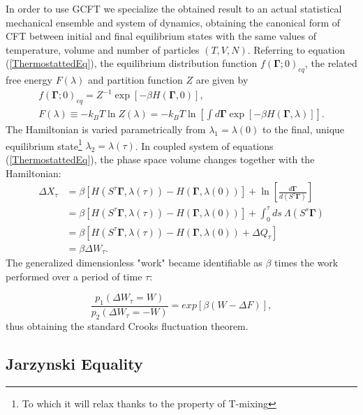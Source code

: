 \documentclass[a4paper,12pt]{article}
\begin{document}
In order to use GCFT we specialize the obtained result to an actual statistical mechanical ensemble and system of dynamics, obtaining the canonical form of CFT between initial and final equilibrium states with the same values of temperature, volume and number of particles $(T,V,N)$. 
Referring to equation (\ref{ThermostattedEq}), the equilibrium distribution function $f(\bm{\Gamma};0)_{eq}$, the related free energy $F(\lambda)$ and partition function $Z$ are given by
\begin{equation}
\begin{aligned}
  f(\bm{\Gamma};0)_{eq}=Z^{-1} \exp[-\beta H(\bm{\Gamma},0)],\\
  F(\lambda)\equiv - k_B T \ln Z(\lambda) = -k_B T \ln[\int d\bm{\Gamma} \exp[-\beta H(\bm{\Gamma},\lambda)]].
\end{aligned}
\end{equation}
The Hamiltonian is varied parametrically from $\lambda_1 =\lambda(0)$ to the final, unique equilibrium state\footnote{To which it will relax thanks to the property of T-mixing} $\lambda_2 = \lambda(\tau)$. In coupled system of equations (\ref{ThermostattedEq}), the phase space volume changes together with the Hamiltonian:
\begin{equation}
\begin{aligned}
  \Delta X_\tau &= \beta [ H(S^\tau \bm{\Gamma}, \lambda(\tau))-H(\bm{\Gamma},\lambda(0))] + \ln\left[\frac{d\bm{\Gamma}}{d(S^\tau \bm{\Gamma})}\right]\\
  &=\beta [ H(S^\tau \bm{\Gamma}, \lambda(\tau))-H(\bm{\Gamma},\lambda(0))] + \int_0^\tau ds\ \Lambda(S^s\bm{\Gamma})\\
  &=\beta [ H(S^\tau \bm{\Gamma}, \lambda(\tau))-H(\bm{\Gamma},\lambda(0)) +\Delta Q_\tau] \\
  &=\beta \Delta W_\tau.
\end{aligned}
\end{equation}
The generalized dimensionless "work" became identifiable as $\beta$ times the work performed over a period of time $\tau$:

\begin{equation}
\label{CFT}
  \frac{p_1(\Delta W_\tau =W)}{p_2(\Delta W_\tau = -W)} = exp[\beta (W - \Delta F)],
\end{equation}
thus obtaining the standard Crooks fluctuation theorem.

\subsection{Jarzynski Equality}
\end{document}
